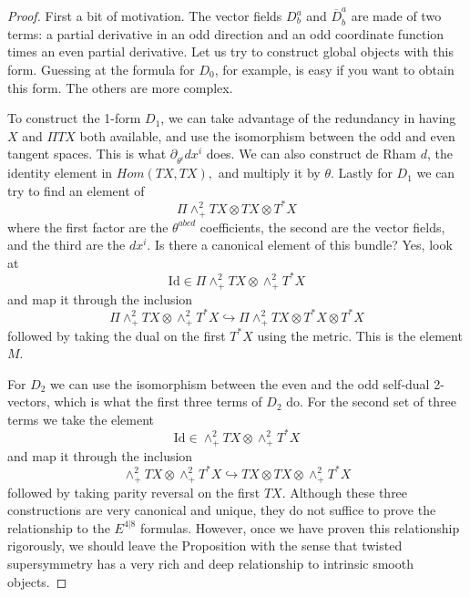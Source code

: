 \documentclass[twoside]{amsart}
\newcommand{\enm}[1]{\ensuremath{#1}}
\newcommand{\superijk}[3]{\enm{{#1}^{#2|#3}}}
\newcommand{\rrij}[2]{\superijk{E}{#1}{#2}}
\renewcommand{\bar}[1]{\overline{#1}}
\newcommand{\upperlowerabc}[3]{\enm{{#1}^{#2}_{#3}}}
\newcommand{\dul}[2]{\upperlowerabc{D}{#1}{#2}}
\begin{document}
\begin{proof} First a bit of motivation.  The vector fields
\dul{a}{b} and \upperlowerabc{\bar{D}}{a}{\dot{b}} are made of two
terms:  a partial derivative
in an odd direction and an odd coordinate function times an even
partial
derivative.  Let us try to construct global objects with this form.
Guessing at the formula for \( D_{0} \), for example, is easy if you
want to obtain
this form. The others are more complex.

To construct the 1-form \( D_{1} \), we can take advantage of the
redundancy in having \( X \) and \( \Pi TX \) both available, and use
the isomorphism between the odd and even tangent spaces.  This is what
\( \partial_{\theta^{i}}dx^{i} \) does.  We can also construct de Rham
\( d \), the identity element in \( Hom(TX, TX), \) and multiply it by
\( \theta \).  Lastly for \( D_{1} \) we can try to find an element of
\[ \Pi\wedge^{2}_{+}TX \otimes TX\otimes T^{*}X \]
where the first factor are the \( \theta^{abcd} \) coefficients, the
second are the vector fields, and the third are the \( dx^{i} \).  Is
there a canonical element of this bundle?  Yes, look at
\[ \mathrm{Id}\in\Pi \wedge^{2}_{+}TX\otimes\wedge^{2}_{+}T^{*}X \]
and map it through the inclusion
\[ \Pi \wedge^{2}_{+}TX\otimes\wedge^{2}_{+}T^{*}X \hookrightarrow
\Pi\wedge^{2}_{+}TX\otimes T^{*}X\otimes T^{*}X \]
followed by taking the dual on the first \( T^{*}X \) using the
metric.  This is the element \( M \).

For \( D_{2} \) we can use the isomorphism between the even and the
odd self-dual 2-vectors, which is what the first three terms of \(
D_{2} \) do.  For the second set of three terms we take the element \[
\mathrm{Id}\in\wedge^{2}_{+}TX\otimes\wedge^{2}_{+}T^{*}X \] and map
it through the inclusion \[
\wedge^{2}_{+}TX\otimes\wedge^{2}_{+}T^{*}X\hookrightarrow TX\otimes
TX\otimes\wedge^{2}_{+}T^{*}X \] followed by taking parity reversal on
the first \( TX \).  Although these three constructions are very
canonical and unique, they do not suffice to prove the relationship to
the \rrij{4}{8} formulas.  However, once we have proven this
relationship rigorously, we should leave the Proposition with the
sense that twisted supersymmetry has a very rich and deep relationship
to intrinsic smooth objects.


\end{proof}
\end{document}
